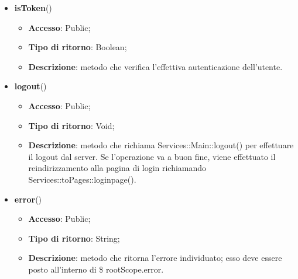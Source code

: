 {\begin{itemize}
		\item \textbf{isToken}()
		\begin{itemize}
			\item \textbf{Accesso}: Public;
			\item \textbf{Tipo di ritorno}: Boolean;
			\item \textbf{Descrizione}: metodo che verifica l'effettiva autenticazione dell'utente.
		\end{itemize}
		\item \textbf{logout}()
		\begin{itemize}
			\item \textbf{Accesso}: Public;
			\item \textbf{Tipo di ritorno}: Void;
			\item \textbf{Descrizione}: metodo che richiama Services::\-Main::\-logout() per effettuare il logout dal server. Se l'operazione va a buon fine, viene effettuato il reindirizzamento alla pagina di login richiamando Services::\-toPages::\-loginpage().
		\end{itemize}
		\item \textbf{error}()
		\begin{itemize}
			\item \textbf{Accesso}: Public;
			\item \textbf{Tipo di ritorno}: String;
			\item \textbf{Descrizione}: metodo che ritorna l'errore individuato; esso deve essere posto all'interno di \$ rootScope.error.
		\end{itemize}
	\end{itemize}

}
